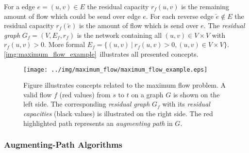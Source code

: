 For a edge $e = (u,v) \in E$ the residual capacity $r_f(u,v)$ is the remaining amount of 
flow which could be send over edge $e$. For each reverse edge $\overleftarrow{e} \notin E$ the
residual capacity $r_f(\overleftarrow{e})$ is the amount of flow which is send over $e$.
The \emph{residual graph} $G_f = (V,E_f,r_f)$ is the network containing all $(u,v) \in V \times V$
with $r_f(u,v) > 0$. More formal $E_f = \{(u,v)\ |\ r_f(u,v) > 0, (u,v) \in V \times V\}$.
\autoref{img:maximum_flow_example}~illustrates all presented concepts.

\begin{figure}
\centering
\texttt{[image: ../img/maximum\_flow/maximum\_flow\_example.eps]}
\caption{Figure illustrates concepts related to the maximum flow problem. A valid flow $f$ 
(red values) from $s$ to $t$ on a graph $G$ is shown on the left side. The corresponding
\emph{residual graph} $G_f$ with its \emph{residual capacities} (black values) 
is illustrated on the right side. The red highlighted path represents an \emph{augmenting path}
in $G$.}
\label{img:maximum_flow_example}
\end{figure}


\subsubsection{Augmenting-Path Algorithms}
\label{sec:aug_path}

